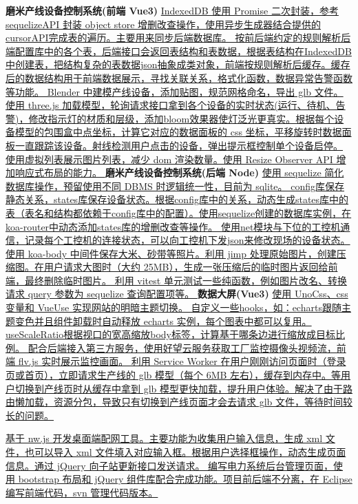 \documentclass{resume}
\begin{document}
\small\textbf{磨米产线设备控制系统(前端 Vue3)}
\ul{
  \li IndexedDB 使用 Promise 二次封装，参考 sequelizeAPI 封装 object store 增删改查操作，使用异步生成器结合提供的 cursorAPI完成表的遍历。主要用来同步后端数据库。
  \li 按前后端约定的规则解析后端配置库中的各个表，后端接口会返回表结构和表数据，根据表结构在IndexedDB中创建表，把结构复杂的表数据json抽象成类对象，前端按规则解析后缓存。缓存后的数据结构用于前端数据展示，寻找关联关系，格式化函数，数据异常告警函数等功能。
  \li Blender 中建模产线设备，添加贴图，规范网格命名，导出 glb 文件。
  \li 使用 three.js 加载模型，轮询请求接口拿到各个设备的实时状态(运行、待机、告警)，修改指示灯的材质和层级，添加bloom效果器使灯泛光更真实。根据每个设备模型的包围盒中点坐标，计算它对应的数据面板的 css 坐标，平移旋转时数据面板一直跟踪该设备。射线检测用户点击的设备，弹出提示框控制单个设备启停。
  \li 使用虚拟列表展示图片列表，减少 dom 渲染数量。使用 Resize Observer API 增加响应式布局的能力。
}
\small\textbf{磨米产线设备控制系统(后端 Node)}
\ul{
  \li 使用 sequelize 简化数据库操作，预留使用不同 DBMS 时逻辑统一性，目前为 sqlite。
  \li config库保存静态关系，states库保存设备状态。根据config库中的关系，动态生成states库中的表（表名和结构都依赖于config库中的配置）。使用sequelize创建的数据库实例，在koa-router中动态添加states库的增删改查等操作。
  \li 使用net模块与下位的工控机通信，记录每个工控机的连接状态，可以向工控机下发json来修改现场的设备状态。
  \li 使用 koa-body 中间件保存大米、砂带等照片。利用 jimp 处理原始图片，创建压缩图。在用户请求大图时（大约 25MB），生成一张压缩后的临时图片返回给前端，最终删除临时图片。
  \li 利用 vitest 单元测试一些纯函数，例如图片改名、转换请求 query 参数为 sequelize 查询配置项等。
}
\small\textbf{数据大屏(Vue3)}
\ul{
  \li 使用 UnoCss、css 变量和 VueUse 实现网站的明暗主题切换。
  \li 自定义一些hooks，如：echarts跟随主题变色并且组件卸载时自动释放 echarts 实例，每个图表中都可以复用。useScaleRatio根据视口的宽高缩放body标签，计算基于哪条边进行缩放成目标比例。
  \li 配合后端接入第三方服务，使用好望云服务获取工厂监控摄像头视频流，前端 flv.js 实时展示监控画面。
  \li 利用 Service Worker 在用户刚刚访问页面时（登录页或首页），立即请求生产线的 glb 模型（每个 6MB 左右），缓存到内存中。等用户切换到产线页时从缓存中拿到 glb 模型更快加载，提升用户体验。解决了由于路由懒加载，资源分包，导致只有切换到产线页面才会去请求 glb 文件，等待时间较长的问题。
}

\ul{
  \li 基于 nw.js 开发桌面端配网工具。主要功能为收集用户输入信息，生成 xml 文件，也可以导入 xml 文件填入对应输入框。根据用户选择框操作，动态生成页面信息。通过 jQuery 向子站更新接口发送请求。
  \li 编写电力系统后台管理页面，使用 bootstrap 布局和 jQuery 组件库配合完成功能。项目前后端不分离，在 Eclipse 编写前端代码，svn 管理代码版本。
}

%
%
\end{document}
